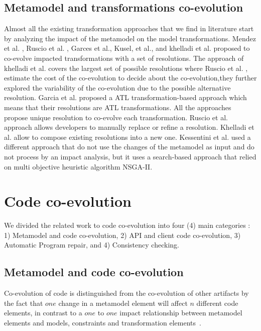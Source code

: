  
\subsection{Metamodel and transformations co-evolution}

Almost all the existing transformation approaches that we find in literature start by analyzing the impact of the metamodel on the model transformations.
Mendez et al. \cite{mendez2010towards}, Ruscio et al. \cite{di2011needed}, Garces et al.\cite{garces2014adapting}, Kusel, et al.\cite{kusel2015consistent}, and khelladi et al. \cite{khelladi2018change} proposed to co-evolve impacted transformations with a set of resolutions. The approach of khelladi et al. \cite{khelladi2018change} covers the largest set of possible resolutions where Ruscio et al. \cite{di2011needed}, estimate the cost of the co-evolution to decide about the co-evolution,they further explored the variability of the co-evolution due to the possible alternative resolution. Garcia et al.\cite{garcia2012model} proposed a ATL transformation-based approach which means that their resolutions are ATL transformations. All the approaches propose unique resolution to co-evolve each transformation.
Ruscio et al. \cite{di2011needed} approach allows developers to manually replace or refine a resolution. Khelladi et al. \cite{khelladi2018change}  allow to compose existing resolutions into a new one. Kessentini et al. \cite{kessentini2018automated} used a different approach that do not use the changes of the metamodel as input and do not process by an impact analysis, but it uses a search-based approach that relied on multi objective heuristic algorithm NSGA-II.
 \section{Code co-evolution}
 We divided the related work to code co-evolution  into four (4) main categories : 1) Metamodel and code co-evolution, 2) API and client code co-evolution, 3) Automatic Program repair, and 4) Consistency checking. 
 \subsection{Metamodel and code co-evolution}
 Co-evolution of code is distinguished from the co-evolution of other artifacts by the fact that $one$ change in a metamodel element will affect $n$ different code elements, in contrast to a $one$ to $one$ impact relationship between metamodel elements and models, constraints and transformation elements~\cite{kessentini2018integrating,kessentini2019automated,cicchetti2008automating,herrmannsdoerfer2009cope,garces2009managing,wachsmuth2007metamodel,batot2017heuristic,khelladi2017semi,correa2007refactoring,kessentini2018automated,khelladi2018change,garces2014adapting,10.1007/978-3-642-36089-3_9,kusel2015consistent,kusel2015systematic}.
 
